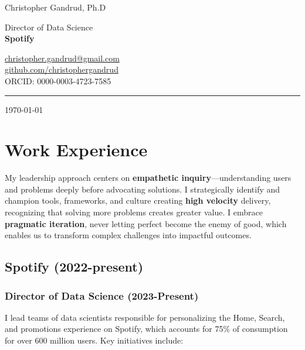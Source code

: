 \documentclass[a4paper]{article}
\begin{document}
\begin{flushright}
    {\huge Christopher Gandrud, Ph.D} \\
    \vspace{0.251cm}

    Director of Data Science \\
    {\bf{\large Spotify}} \\
    \vspace{0.25cm}

    \href{mailto:christopher.gandrud@gmail.com}{christopher.gandrud@gmail.com} \\
    \href{https://github.com/christophergandrud}{github.com/christophergandrud} \\
    ORCID: 0000-0003-4723-7585 \\
    \medskip\hrule height 1pt

    \vspace{0.5cm}
    \today
\end{flushright}

\vspace{0.5cm}

\section*{Work Experience}

\noindent My leadership approach centers on \textbf{empathetic inquiry}—understanding users and problems deeply before advocating solutions. I strategically identify and champion tools, frameworks, and culture creating \textbf{high velocity} delivery, recognizing that solving more problems creates greater value. I embrace \textbf{pragmatic iteration}, never letting perfect become the enemy of good, which enables us to transform complex challenges into impactful outcomes.

\subsection*{Spotify (2022-present)}

\subsubsection*{Director of Data Science (2023-Present)}

I lead teams of data scientists responsible for personalizing the Home, Search, and promotions experience on Spotify, which accounts for 75\% of consumption for over 600 million users. Key initiatives include: \\
\end{document}
